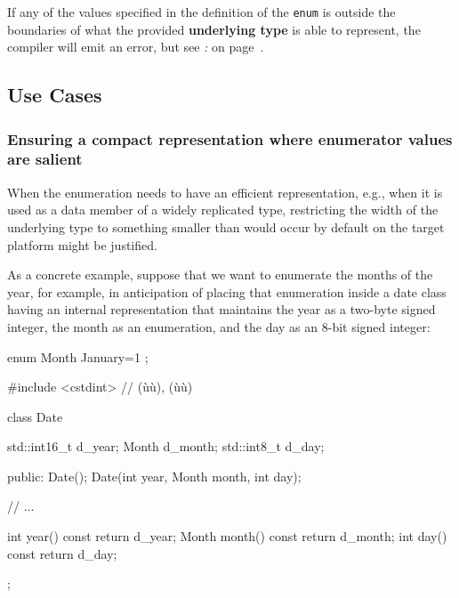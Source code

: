 \noindent If any of the values specified in the definition of the \texttt{enum} is
outside the boundaries of what the provided \textbf{underlying type} is
able to represent, the compiler will emit an error, but see \textit{: } on page~\pageref{subtleties-of-integral-promotion}.

\subsection[Use Cases]{Use Cases}\label{use-cases}

\subsubsection[Ensuring a compact representation where enumerator values are salient]{Ensuring a compact representation where enumerator values are salient}\label{ensuring-a-compact-representation-where-enumerator-values-are-salient}

When the enumeration needs to have an efficient representation, e.g.,
when it is used as a data member of a widely replicated type,
restricting the width of the underlying type to something smaller than
would occur by default on the target platform might be justified.

As a concrete example, suppose that we want to enumerate the months of
the year, for example, in anticipation of placing that enumeration
inside a date class having an internal representation that maintains the
year as a two-byte signed integer, the month as an enumeration, and the
day as an 8-bit signed integer:

\begin{emcppshiddenlisting}[emcppsbatch=e1]
enum Month { January=1 };
\end{emcppshiddenlisting}
\begin{emcppslisting}[emcppsbatch=e1]
#include <cstdint>  // (ù{}ù), (ù{}ù)

class Date
{
    std::int16_t d_year;
    Month        d_month;
    std::int8_t  d_day;

public:
    Date();
    Date(int year, Month month, int day);

    // ...

    int year() const    { return d_year; }
    Month month() const { return d_month; }
    int day() const     { return d_day; }
};
\end{emcppslisting}

